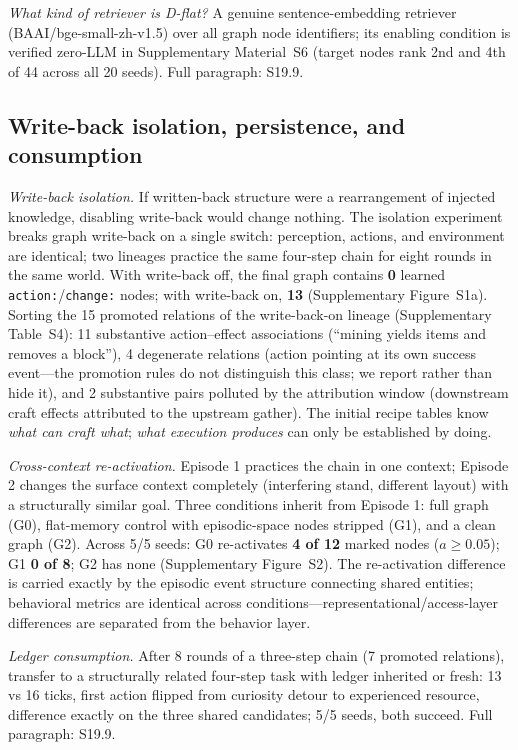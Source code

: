 \documentclass[10pt]{article}
\begin{document}
\emph{What kind of retriever is D-flat?} A genuine sentence-embedding retriever (BAAI/bge-small-zh-v1.5) over all graph node identifiers; its enabling condition is verified zero-LLM in Supplementary Material~S6 (target nodes rank 2nd and 4th of 44 across all 20 seeds). Full paragraph: S19.9.

\subsection{Write-back isolation, persistence, and consumption}
\label{sec:res-persist}

\emph{Write-back isolation.} If written-back structure were a rearrangement of injected knowledge, disabling write-back would change nothing. The isolation experiment breaks graph write-back on a single switch: perception, actions, and environment are identical; two lineages practice the same four-step chain for eight rounds in the same world. With write-back off, the final graph contains \textbf{0} learned \texttt{action:}/\texttt{change:} nodes; with write-back on, \textbf{13} (Supplementary Figure~S1a). Sorting the 15 promoted relations of the write-back-on lineage (Supplementary Table~S4): 11 substantive action--effect associations (``mining yields items and removes a block''), 4 degenerate relations (action pointing at its own success event---the promotion rules do not distinguish this class; we report rather than hide it), and 2 substantive pairs polluted by the attribution window (downstream craft effects attributed to the upstream gather). The initial recipe tables know \emph{what can craft what}; \emph{what execution produces} can only be established by doing.

\emph{Cross-context re-activation.} Episode 1 practices the chain in one context; Episode 2 changes the surface context completely (interfering stand, different layout) with a structurally similar goal. Three conditions inherit from Episode 1: full graph (G0), flat-memory control with episodic-space nodes stripped (G1), and a clean graph (G2). Across 5/5 seeds: G0 re-activates \textbf{4 of 12} marked nodes ($a\ge0.05$); G1 \textbf{0 of 8}; G2 has none (Supplementary Figure~S2). The re-activation difference is carried exactly by the episodic event structure connecting shared entities; behavioral metrics are identical across conditions---representational/access-layer differences are separated from the behavior layer.

\emph{Ledger consumption.} After 8 rounds of a three-step chain (7 promoted relations), transfer to a structurally related four-step task with ledger inherited or fresh: 13 vs 16 ticks, first action flipped from curiosity detour to experienced resource, difference exactly on the three shared candidates; 5/5 seeds, both succeed. Full paragraph: S19.9.
\end{document}
